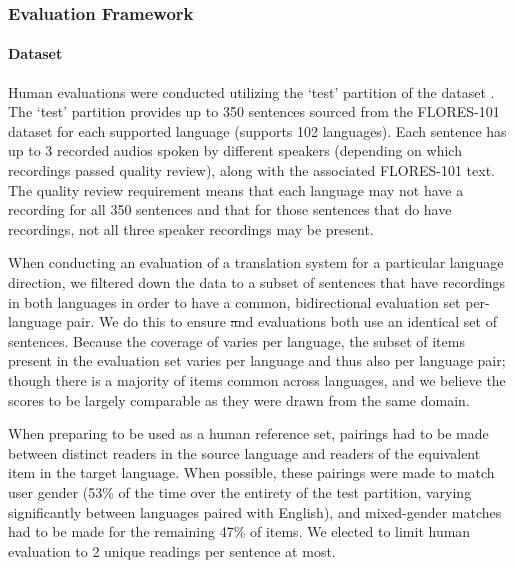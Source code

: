\subsubsection{Evaluation Framework}

\paragraph{Dataset} Human evaluations were conducted utilizing the `test' partition of the \fleurs dataset \citep{fleurs2022arxiv}.  The \fleurs `test' partition provides up to 350 sentences sourced from the FLORES-101 dataset \citep{flores101:2021} for each supported language (\fleurs supports 102 languages). Each sentence has up to 3 recorded audios spoken by different speakers (depending on which recordings passed quality review), along with the associated FLORES-101 text. The quality review requirement means that each language may not have a recording for all 350 sentences and that for those sentences that do have recordings, not all three speaker recordings may be present.

When conducting an evaluation of a translation system for a particular language direction, we filtered down the \fleurs data to a subset of sentences that have recordings in both languages in order to have a common, bidirectional evaluation set per-language pair. We do this to ensure \st and \sst evaluations both use an identical set of sentences. Because the coverage of \fleurs varies per language, the subset of items present in the evaluation set varies per language and thus also per language pair; though there is a majority of items common across languages, and we believe the scores to be largely comparable as they were drawn from the same domain.  

When preparing \fleurs to be used as a human reference set, pairings had to be made between distinct readers in the source language and readers of the equivalent \fleurs item in the target language.  When possible, these pairings were made to match user gender (53\% of the time over the entirety of the \fleurs test partition, varying significantly between languages paired with English), and mixed-gender matches had to be made for the remaining 47\% of items. We elected to limit human evaluation to 2 unique readings per \fleurs sentence at most.  %

 


